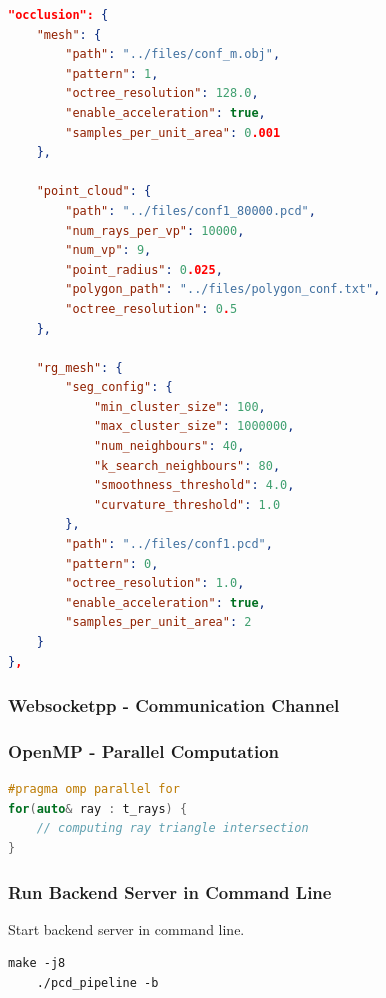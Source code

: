 \documentclass[11pt, a4paper,oneside,chapterprefix=false]{scrbook}
\begin{document}
\begin{lstlisting}[language=json, caption=Json Configuration File]
"occlusion": {
	"mesh": {
		"path": "../files/conf_m.obj",
		"pattern": 1,
		"octree_resolution": 128.0,
		"enable_acceleration": true,
		"samples_per_unit_area": 0.001
	},

	"point_cloud": {
		"path": "../files/conf1_80000.pcd",
		"num_rays_per_vp": 10000, 
		"num_vp": 9, 
		"point_radius": 0.025,
		"polygon_path": "../files/polygon_conf.txt",
		"octree_resolution": 0.5
	},

	"rg_mesh": {
		"seg_config": {
			"min_cluster_size": 100,
			"max_cluster_size": 1000000,
			"num_neighbours": 40,
			"k_search_neighbours": 80,
			"smoothness_threshold": 4.0,
			"curvature_threshold": 1.0
		},
		"path": "../files/conf1.pcd",
		"pattern": 0,
		"octree_resolution": 1.0,
		"enable_acceleration": true,
		"samples_per_unit_area": 2
	}
},
\end{lstlisting}

\subsubsection{Websocketpp - Communication Channel} \label{subsec:websocketpp}

\subsubsection{OpenMP - Parallel Computation} \label{subsec:openmp}
\begin{lstlisting}[language=C++, caption=Region Growing]
#pragma omp parallel for
for(auto& ray : t_rays) {
	// computing ray triangle intersection
}
\end{lstlisting}

\subsubsection{Run Backend Server in Command Line} \label{subsec:backend command line}

Start backend server in command line.

\begin{lstlisting}[style=terminal]
	make -j8
	./pcd_pipeline -b
\end{lstlisting}
\end{document}
